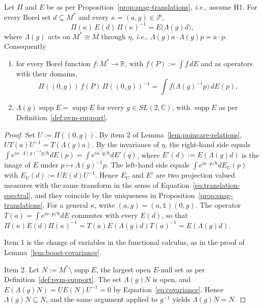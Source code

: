 \begin{lemma}\label{lem:poincare-covariance}
	Let $\Pi$ and $E$ be as per Proposition~\ref{prop:snag-translations}, \textit{i.e.}, assume H1. For every Borel set $d\subseteq M^*$ and every $\kappa=(a,g)\in\mathcal{P}$,
	\begin{equation}\label{eq:covariance}
		\Pi(\kappa)\,E(d)\,\Pi(\kappa)^{-1}=E\big(\Lambda(g)d\big),
	\end{equation}
	where $\Lambda(g)$ acts on $M^*\cong M$ through $\eta$, \textit{i.e.}, $\Lambda(g)a\cdot\Lambda(g)p=a\cdot p$. Consequently
	\begin{enumerate}
		\item for every Borel function $f:M^*\to\mathbb{R}$, with $f(P):=\int f\,dE$ and as operators with their domains,
		\begin{equation*}
			\Pi((0,g))\,f(P)\,\Pi((0,g))^{-1}=\int f\big(\Lambda(g)^{-1}p\big)\,dE(p),
		\end{equation*}
		\item $\Lambda(g)\operatorname{supp}E=\operatorname{supp}E$ for every $g\in SL(2,\mathbb{C})$, with $\operatorname{supp}E$ as per Definition~\ref{def:pvm-support}.
	\end{enumerate}
\end{lemma}

\begin{proof}
	Set $U:=\Pi((0,g))$. By item 2 of Lemma~\ref{lem:poincare-relations}, $UT(a)U^{-1}=T(\Lambda(g)a)$. By the invariance of $\eta$, the right-hand side equals $\int e^{ia\cdot\Lambda(g)^{-1}p/\hbar}dE(p)=\int e^{ia\cdot q/\hbar}dE'(q)$, where $E'(d):=E(\Lambda(g)d)$ is the image of $E$ under $p\mapsto\Lambda(g)^{-1}p$. The left-hand side equals $\int e^{ia\cdot p/\hbar}dE_U(p)$ with $E_U(d):=UE(d)U^{-1}$. Hence $E_U$ and $E'$ are two projection valued measures with the same transform in the sense of Equation~\eqref{eq:translation-spectral}, and they coincide by the uniqueness in Proposition~\ref{prop:snag-translations}. For a general $\kappa$, write $(a,g)=(a,\mathbb{1})(0,g)$. The operator $T(a)=\int e^{ia\cdot p/\hbar}dE$ commutes with every $E(d)$, so that $\Pi(\kappa)E(d)\Pi(\kappa)^{-1}=T(a)E(\Lambda(g)d)T(a)^{-1}=E(\Lambda(g)d)$.
	
	Item 1 is the change of variables in the functional calculus, as in the proof of Lemma~\ref{lem:boost-covariance}.
	
	Item 2. Let $N:=M^*\setminus\operatorname{supp}E$, the largest open $E$-null set as per Definition~\ref{def:pvm-support}. The set $\Lambda(g)N$ is open, and $E(\Lambda(g)N)=UE(N)U^{-1}=0$ by Equation~\eqref{eq:covariance}. Hence $\Lambda(g)N\subseteq N$, and the same argument applied to $g^{-1}$ yields $\Lambda(g)N=N$.
\end{proof}

